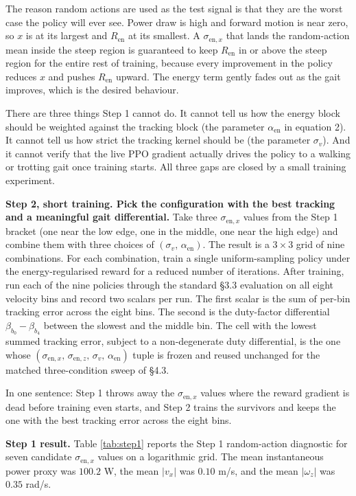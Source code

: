 The reason random actions are used as the test signal is that they are the worst case the policy will ever see. Power draw is high and forward motion is near zero, so $x$ is at its largest and $R_{\mathrm{en}}$ at its smallest. A $\sigma_{\mathrm{en},x}$ that lands the random-action mean inside the steep region is guaranteed to keep $R_{\mathrm{en}}$ in or above the steep region for the entire rest of training, because every improvement in the policy reduces $x$ and pushes $R_{\mathrm{en}}$ upward. The energy term gently fades out as the gait improves, which is the desired behaviour.

There are three things Step 1 cannot do. It cannot tell us how the energy block should be weighted against the tracking block (the parameter $\alpha_{\mathrm{en}}$ in equation 2). It cannot tell us how strict the tracking kernel should be (the parameter $\sigma_v$). And it cannot verify that the live PPO gradient actually drives the policy to a walking or trotting gait once training starts. All three gaps are closed by a small training experiment.

\textbf{Step 2, short training. Pick the configuration with the best tracking and a meaningful gait differential.} Take three $\sigma_{\mathrm{en},x}$ values from the Step 1 bracket (one near the low edge, one in the middle, one near the high edge) and combine them with three choices of $(\sigma_v,\,\alpha_{\mathrm{en}})$. The result is a $3 \times 3$ grid of nine combinations. For each combination, train a single uniform-sampling policy under the energy-regularised reward for a reduced number of iterations. After training, run each of the nine policies through the standard \S3.3 evaluation on all eight velocity bins and record two scalars per run. The first scalar is the sum of per-bin tracking error across the eight bins. The second is the duty-factor differential $\beta_{b_0} - \beta_{b_4}$ between the slowest and the middle bin. The cell with the lowest summed tracking error, subject to a non-degenerate duty differential, is the one whose $(\sigma_{\mathrm{en},x},\,\sigma_{\mathrm{en},z},\,\sigma_v,\,\alpha_{\mathrm{en}})$ tuple is frozen and reused unchanged for the matched three-condition sweep of \S4.3.

In one sentence: Step 1 throws away the $\sigma_{\mathrm{en},x}$ values where the reward gradient is dead before training even starts, and Step 2 trains the survivors and keeps the one with the best tracking error across the eight bins.

\textbf{Step 1 result.} Table \ref{tab:step1} reports the Step 1 random-action diagnostic for seven candidate $\sigma_{\mathrm{en},x}$ values on a logarithmic grid. The mean instantaneous power proxy was $100.2$ W, the mean $|v_x|$ was $0.10$ m/s, and the mean $|\omega_z|$ was $0.35$ rad/s.


